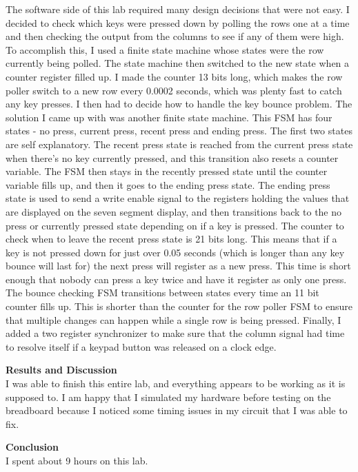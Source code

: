 \documentclass[11pt,letterpaper]{article}
\begin{document}
The software side of this lab required many design decisions that were not easy. I decided to check which keys were pressed down by polling the rows one at a time and then checking the output from the columns to see if any of them were high. To accomplish this, I used a finite state machine whose states were the row currently being polled. The state machine then switched to the new state when a counter register filled up. I made the counter 13 bits long, which makes the row poller switch to a new row every 0.0002 seconds, which was plenty fast to catch any key presses. I then had to decide how to handle the key bounce problem. The solution I came up with was another finite state machine. This FSM has four states - no press, current press, recent press and ending press. The first two states are self explanatory. The recent press state is reached from the current press state when there's no key currently pressed, and this transition also resets a counter variable. The FSM then stays in the recently pressed state until the counter variable fills up, and then it goes to the ending press state. The ending press state is used to send a write enable signal to the registers holding the values that are displayed on the seven segment display, and then transitions back to the no press or currently pressed state depending on if a key is pressed. The counter to check when to leave the recent press state is 21 bits long. This means that if a key is not pressed down for just over 0.05 seconds (which is longer than any key bounce will last for) the next press will register as a new press. This time is short enough that nobody can press a key twice and have it register as only one press. The bounce checking FSM transitions between states every time an 11 bit counter fills up. This is shorter than the counter for the row poller FSM to ensure that multiple changes can happen while a single row is being pressed. Finally, I added a two register synchronizer to make sure that the column signal had time to resolve itself if a keypad button was released on a clock edge.


\noindent\textbf{Results and Discussion}\\
I was able to finish this entire lab, and everything appears to be working as it is supposed to. I am happy that I simulated my hardware before testing on the breadboard because I noticed some timing issues in my circuit that I was able to fix.

\noindent\textbf{Conclusion}\\
I spent about 9 hours on this lab. 
\end{document}

